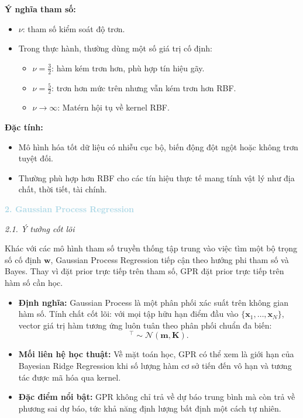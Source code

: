 \textbf{Ý nghĩa tham số:}
\begin{itemize} [labelsep=10pt, leftmargin=2cm]
    \item $\nu$: tham số kiểm soát độ trơn.
    \item Trong thực hành, thường dùng một số giá trị cố định:
    \begin{itemize}
        \item $\nu=\frac{3}{2}$: hàm kém trơn hơn, phù hợp tín hiệu gãy.
        \item $\nu=\frac{5}{2}$: trơn hơn mức trên nhưng vẫn kém trơn hơn RBF.
        \item $\nu\to\infty$: Mat\'ern hội tụ về kernel RBF.
    \end{itemize}
\end{itemize}

\textbf{Đặc tính:}
\begin{itemize} [labelsep=10pt, leftmargin=2cm]
    \item Mô hình hóa tốt dữ liệu có nhiễu cục bộ, biến động đột ngột hoặc không trơn tuyệt đối.
    \item Thường phù hợp hơn RBF cho các tín hiệu thực tế mang tính vật lý như địa chất, thời tiết, tài chính.
\end{itemize}


\vspace{0.5em}
\noindent\textcolor{lightblue}{\textbf{2. Gaussian Process Regression}}
\vspace{0.5em}

\noindent\textcolor{infocolor}{\textit{2.1. Ý tưởng cốt lõi}}

Khác với các mô hình tham số truyền thống tập trung vào việc tìm một bộ trọng số cố định $\mathbf{w}$, Gaussian Process Regression tiếp cận theo hướng phi tham số và Bayes. Thay vì đặt prior trực tiếp trên tham số, GPR đặt prior trực tiếp trên hàm số cần học.

\begin{itemize}
    \item \textbf{Định nghĩa:} Gaussian Process là một phân phối xác suất trên không gian hàm số. Tính chất cốt lõi: với mọi tập hữu hạn điểm đầu vào $\{\mathbf{x}_1,\ldots,\mathbf{x}_N\}$, vector giá trị hàm tương ứng luôn tuân theo phân phối chuẩn đa biến:
    \begin{equation}
        [f(\mathbf{x}_1),\ldots,f(\mathbf{x}_N)]^\top \sim \mathcal{N}(\mathbf{m},\mathbf{K}).
    \end{equation}

    \item \textbf{Mối liên hệ học thuật:} Về mặt toán học, GPR có thể xem là giới hạn của Bayesian Ridge Regression khi số lượng hàm cơ sở tiến đến vô hạn và tương tác được mã hóa qua kernel.

    \item \textbf{Đặc điểm nổi bật:} GPR không chỉ trả về dự báo trung bình mà còn trả về phương sai dự báo, tức khả năng định lượng bất định một cách tự nhiên.
\end{itemize}

